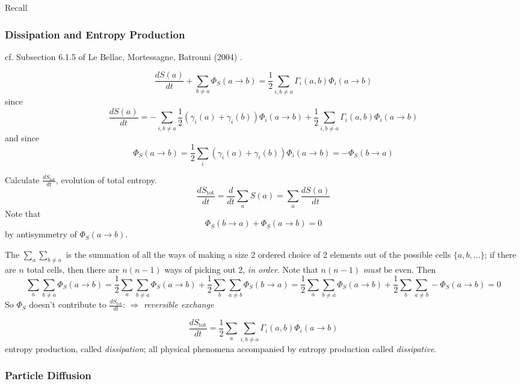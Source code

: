 \documentclass[10pt]{amsart}
\begin{document}
\begin{multicols*}{2}
Recall



\subsubsection{Dissipation and Entropy Production}

cf. Subsection 6.1.5 of Le Bellac, Mortessagne, Batrouni (2004) \cite{MLeBellacFMortessagneGBatrouni2004}. 





\begin{equation}
  \frac{dS(a)}{dt} + \sum_{b\neq a} \Phi_S(a\to b) = \frac{1}{2} \sum_{i,b\neq a} \Gamma_i(a,b) \Phi_i(a\to b)
\end{equation}
since 
\[
\frac{dS(a)}{dt} = -\sum_{i,b\neq a} \frac{1}{2} ( \gamma_i(a) + \gamma_i(b)) \Phi_i(a\to b) + \frac{1}{2} \sum_{i,b\neq a} \Gamma_i(a,b) \Phi_i(a\to b)
\]
and since
\begin{equation}
\Phi_S(a\to b) = \frac{1}{2} \sum_i (\gamma_i(a) + \gamma_i(b))\Phi_i(a\to b) = -\Phi_S(b\to a)
\end{equation}

Calculate $\frac{dS_{\text{tot}}}{dt}$, evolution of total entropy.  
\[
\frac{dS_{\text{tot}}}{dt} = \frac{d}{dt} \sum_a S(a) = \sum_a \frac{dS(a)}{dt}
\]
Note that 
\[
\Phi_S(b\to a) + \Phi_S(a\to b) = 0 
\]
by antisymmetry of $\Phi_S(a\to b)$. 

The $\sum_a \sum_{b\neq a}$ is the summation of all the ways of making a size 2 ordered choice of 2 elements out of the possible cells $\lbrace a, b, \dots \rbrace$; if there are $n$ total cells, then there are $n(n-1)$ ways of picking out 2, \emph{in order}.  Note that $n(n-1)$ \emph{must} be even.  Then
\[
\sum_a \sum_{b\neq a} \Phi_S(a\to b) = \frac{1}{2} \sum_a \sum_{b\neq a} \Phi_S(a\to b) + \frac{1}{2} \sum_b \sum_{a\neq b} \Phi_S(b\to a) = \frac{1}{2} \sum_a \sum_{b\neq a} \Phi_S(a\to b) + \frac{1}{2} \sum_b \sum_{a\neq b} - \Phi_S(a\to b) = 0 
\]
So $\Phi_S$ doesn't contribute to $\frac{d S_{\text{tot}}}{dt}$: $\Longrightarrow $ \emph{reversible exchange}

\[
\frac{dS_{\text{tot}}}{dt} = \frac{1}{2} \sum_a \sum_{i,b\neq a} \Gamma_i(a,b) \Phi_i(a\to b)
\]
entropy production, called \emph{dissipation}; all physical phenomena accompanied by entropy production called \emph{dissipative}.  





\subsubsection{Particle Diffusion}


\end{multicols*}
\end{document}
